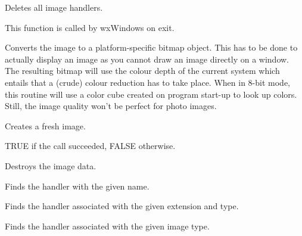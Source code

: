 

Deletes all image handlers.

This function is called by wxWindows on exit.

\label{wximageconverttobitmap}


Converts the image to a platform-specific bitmap object. This has to be done
to actually display an image as you cannot draw an image directly on a window.
The resulting bitmap will use the colour depth of the current system which entails
that a (crude) colour reduction has to take place. When in 8-bit mode, this
routine will use a color cube created on program start-up to look up colors.
Still, the image quality won't be perfect for photo images.

\label{wximagecreate}


Creates a fresh image.





TRUE if the call succeeded, FALSE otherwise.

\label{wximagedestroy}


Destroys the image data.



Finds the handler with the given name.


Finds the handler associated with the given extension and type.


Finds the handler associated with the given image type.

